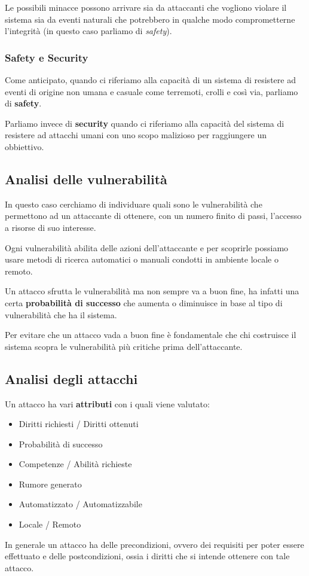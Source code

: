 Le possibili minacce possono arrivare sia da attaccanti che vogliono violare il sistema sia da eventi naturali che
potrebbero in qualche modo comprometterne l'integrità (in questo caso parliamo di \emph{safety}).

\subsubsection{Safety e Security}
Come anticipato, quando ci riferiamo alla capacità di un sistema di resistere ad eventi di origine non umana e casuale
come terremoti, crolli e così via, parliamo di \textbf{safety}.

Parliamo invece di \textbf{security} quando ci riferiamo alla capacità del sistema di resistere ad attacchi umani con
uno scopo malizioso per raggiungere un obbiettivo.

\subsection{Analisi delle vulnerabilità}
In questo caso cerchiamo di individuare quali sono le vulnerabilità che permettono ad un attaccante di ottenere, con
un numero finito di passi, l'accesso a risorse di suo interesse.

Ogni vulnerabilità abilita delle azioni dell'attaccante e per scoprirle possiamo usare metodi di ricerca automatici o
manuali condotti in ambiente locale o remoto.

Un attacco sfrutta le vulnerabilità ma non sempre va a buon fine, ha infatti una certa \textbf{probabilità di successo}
che aumenta o diminuisce in base al tipo di vulnerabilità che ha il sistema.

Per evitare che un attacco vada a buon fine è fondamentale che chi costruisce il sistema scopra le vulnerabilità più
critiche prima dell'attaccante.

\subsection{Analisi degli attacchi}
Un attacco ha vari \textbf{attributi} con i quali viene valutato:
\begin{itemize}
	\item Diritti richiesti / Diritti ottenuti
	\item Probabilità di successo
	\item Competenze / Abilità richieste
	\item Rumore generato
	\item Automatizzato / Automatizzabile
	\item Locale / Remoto
\end{itemize}
In generale un attacco ha delle precondizioni, ovvero dei requisiti per poter essere effettuato e delle postcondizioni,
ossia i diritti che si intende ottenere con tale attacco.

